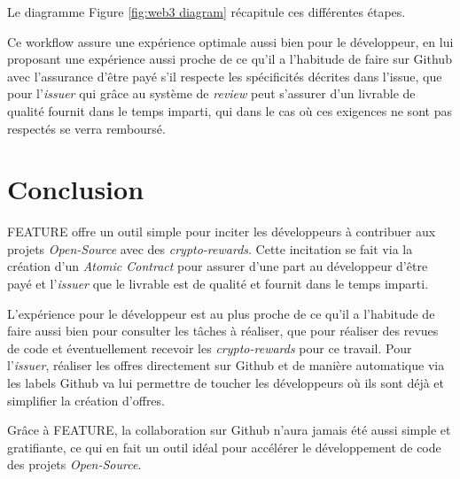 \documentclass[
	a4paper, %
	10pt, %
	unnumberedsections, %
	twoside, %
]{LTJournalArticle}
\begin{document}
Le diagramme Figure \ref{fig:web3 diagram} récapitule ces différentes étapes.

Ce workflow assure une expérience optimale aussi bien pour le développeur, en lui proposant une expérience aussi proche de ce qu'il a l'habitude de faire sur Github avec l'assurance d'être payé s'il respecte les spécificités décrites dans l'issue, que pour l'\emph{issuer} qui grâce au système de \emph{review} peut s'assurer d'un livrable de qualité fournit dans le temps imparti, qui dans le cas où ces exigences ne sont pas respectés se verra remboursé.

\section{Conclusion}

FEATURE offre un outil simple pour inciter les développeurs à contribuer aux projets \emph{Open-Source} avec des \emph{crypto-rewards}. Cette incitation se fait via la création d'un \emph{Atomic Contract} pour assurer d'une part au développeur d'être payé et l'\emph{issuer} que le livrable est de qualité et fournit dans le temps imparti.

L'expérience pour le développeur est au plus proche de ce qu'il a l'habitude de faire aussi bien pour consulter les tâches à réaliser, que pour réaliser des revues de code et éventuellement recevoir les \emph{crypto-rewards} pour ce travail. Pour l'\emph{issuer}, réaliser les offres directement sur Github et de manière automatique via les labels Github va lui permettre de toucher les développeurs où ils sont déjà et simplifier la création d'offres.

Grâce à FEATURE, la collaboration sur Github n'aura jamais été aussi simple et gratifiante, ce qui en fait un outil idéal pour accélérer le développement de code des projets \emph{Open-Source}.
\end{document}
